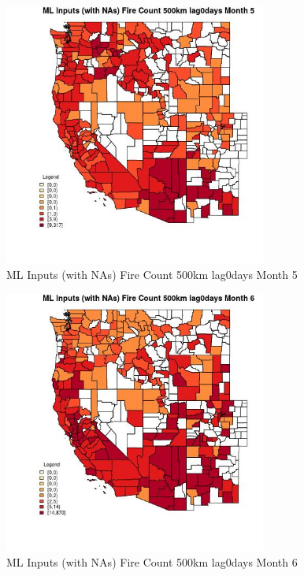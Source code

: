\clearpage 

\begin{figure} 
\centering  
\includegraphics[width=0.77\textwidth]{Code_Outputs/Report_ML_input_PM25_Step4_part_e_de_duplicated_aves_compiled_2019-05-20wNAs_CountyFire_Count_500km_lag0daysmedianMonth5.jpg} 
\caption{\label{fig:Report_ML_input_PM25_Step4_part_e_de_duplicated_aves_compiled_2019-05-20wNAsCountyFire_Count_500km_lag0daysmedianMonth5}ML Inputs (with NAs) Fire Count 500km lag0days Month 5} 
\end{figure} 
 

\begin{figure} 
\centering  
\includegraphics[width=0.77\textwidth]{Code_Outputs/Report_ML_input_PM25_Step4_part_e_de_duplicated_aves_compiled_2019-05-20wNAs_CountyFire_Count_500km_lag0daysmedianMonth6.jpg} 
\caption{\label{fig:Report_ML_input_PM25_Step4_part_e_de_duplicated_aves_compiled_2019-05-20wNAsCountyFire_Count_500km_lag0daysmedianMonth6}ML Inputs (with NAs) Fire Count 500km lag0days Month 6} 
\end{figure} 
 

